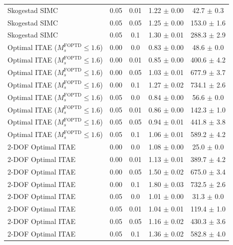 \begin{table}[t]
{\begin{tabular}{lcccc}
Skogestad SIMC & 0.05 & 0.01 & 1.22 $\pm$ 0.00 & 42.7 $\pm$ 0.3 \\
Skogestad SIMC & 0.05 & 0.05 & 1.25 $\pm$ 0.00 & 153.0 $\pm$ 1.6 \\
Skogestad SIMC & 0.05 & 0.1 & 1.30 $\pm$ 0.01 & 288.3 $\pm$ 2.9 \\
Optimal ITAE ($M_s^{\mathrm{FOPTD}} \leq 1.6$) & 0.00 & 0.0 & 0.83 $\pm$ 0.00 & 48.6 $\pm$ 0.0 \\
Optimal ITAE ($M_s^{\mathrm{FOPTD}} \leq 1.6$) & 0.00 & 0.01 & 0.85 $\pm$ 0.00 & 400.6 $\pm$ 4.2 \\
Optimal ITAE ($M_s^{\mathrm{FOPTD}} \leq 1.6$) & 0.00 & 0.05 & 1.03 $\pm$ 0.01 & 677.9 $\pm$ 3.7 \\
Optimal ITAE ($M_s^{\mathrm{FOPTD}} \leq 1.6$) & 0.00 & 0.1 & 1.27 $\pm$ 0.02 & 734.1 $\pm$ 2.6 \\
Optimal ITAE ($M_s^{\mathrm{FOPTD}} \leq 1.6$) & 0.05 & 0.0 & 0.84 $\pm$ 0.00 & 56.6 $\pm$ 0.0 \\
Optimal ITAE ($M_s^{\mathrm{FOPTD}} \leq 1.6$) & 0.05 & 0.01 & 0.86 $\pm$ 0.00 & 142.3 $\pm$ 1.0 \\
Optimal ITAE ($M_s^{\mathrm{FOPTD}} \leq 1.6$) & 0.05 & 0.05 & 0.94 $\pm$ 0.01 & 441.8 $\pm$ 3.8 \\
Optimal ITAE ($M_s^{\mathrm{FOPTD}} \leq 1.6$) & 0.05 & 0.1 & 1.06 $\pm$ 0.01 & 589.2 $\pm$ 4.2 \\
2-DOF Optimal ITAE & 0.00 & 0.0 & 1.08 $\pm$ 0.00 & 25.0 $\pm$ 0.0 \\
2-DOF Optimal ITAE & 0.00 & 0.01 & 1.13 $\pm$ 0.01 & 389.7 $\pm$ 4.2 \\
2-DOF Optimal ITAE & 0.00 & 0.05 & 1.50 $\pm$ 0.02 & 675.0 $\pm$ 3.4 \\
2-DOF Optimal ITAE & 0.00 & 0.1 & 1.80 $\pm$ 0.03 & 732.5 $\pm$ 2.6 \\
2-DOF Optimal ITAE & 0.05 & 0.0 & 1.01 $\pm$ 0.00 & 31.3 $\pm$ 0.0 \\
2-DOF Optimal ITAE & 0.05 & 0.01 & 1.04 $\pm$ 0.01 & 119.4 $\pm$ 1.0 \\
2-DOF Optimal ITAE & 0.05 & 0.05 & 1.16 $\pm$ 0.02 & 430.3 $\pm$ 3.6 \\
2-DOF Optimal ITAE & 0.05 & 0.1 & 1.36 $\pm$ 0.02 & 582.8 $\pm$ 4.0 \\
\bottomrule
\end{tabular}%
}
\end{table}
